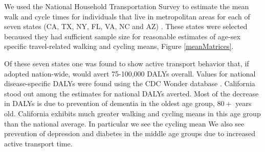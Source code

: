 We used the National Household Transportation Survey to estimate the
mean walk and cycle times for individuals that live in metropolitan
areas for each of seven states (CA, TX, NY, FL, VA, NC and AZ)
\cite{NHTS}.  These states were selected becaused they had sufficient
sample size for reasonable estimates of age-sex specific
travel-related walking and cycling means, Figure \ref{meanMatrices}.

Of these seven states one was found to show active transport behavior
that, if adopted nation-wide, would avert 75-100,000 DALYs overall.
Values for national disease-specific DALYs were found using the CDC
Wonder database \cite{CDCWonder}.  California stood out among the
estimates for national DALYs averted.  Most of the decrease in DALYs
is due to prevention of dementia in the oldest age group, $80+$ years
old.  California exhibits much greater walking and cycling means in
this age group than the national average. In particular we see the
cycling mean We also see prevention of depression and diabetes in the
middle age groups due to increased active transport time.
